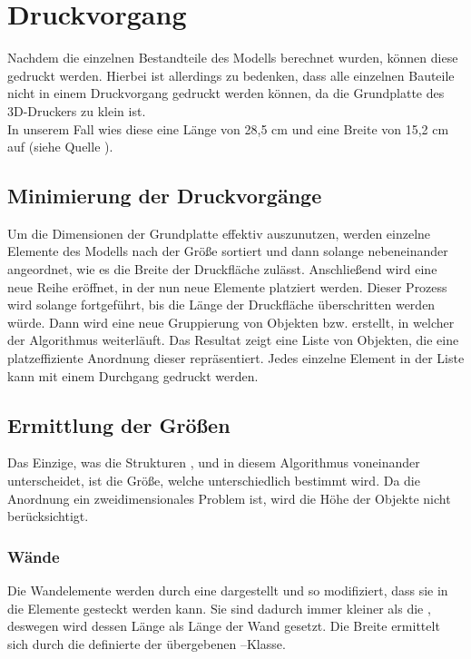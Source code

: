 \section{Druckvorgang}
Nachdem die einzelnen Bestandteile des Modells berechnet wurden, können diese gedruckt werden.
Hierbei ist allerdings zu bedenken, dass alle einzelnen Bauteile nicht in einem Druckvorgang gedruckt werden können, da die Grundplatte des 3D-Druckers zu klein ist. \\
In unserem Fall wies diese eine Länge von 28,5 cm und eine Breite von 15,2 cm auf (siehe Quelle \cite{makerbotspecs}).
\subsection{Minimierung der Druckvorgänge}
Um die Dimensionen der Grundplatte effektiv auszunutzen, werden einzelne Elemente des Modells nach der Größe sortiert und dann solange nebeneinander angeordnet, wie es die Breite der Druckfläche zulässt.
Anschließend wird eine neue Reihe eröffnet, in der nun neue Elemente platziert werden. 
Dieser Prozess wird solange fortgeführt, bis die Länge der Druckfläche überschritten werden würde.
Dann wird eine neue Gruppierung von Objekten bzw.  erstellt, in welcher der Algorithmus weiterläuft.
Das Resultat zeigt eine Liste von Objekten, die eine platzeffiziente Anordnung dieser repräsentiert.
Jedes einzelne Element in der Liste kann mit einem Durchgang gedruckt werden.
\subsection{Ermittlung der Größen}
Das Einzige, was die Strukturen ,  und  in diesem Algorithmus voneinander unterscheidet, ist die Größe, welche unterschiedlich bestimmt wird.
Da die Anordnung ein zweidimensionales Problem ist, wird die Höhe der Objekte nicht berücksichtigt.
\subsubsection{Wände}
Die Wandelemente werden durch eine  dargestellt und so modifiziert, dass sie in die  Elemente gesteckt werden kann.
Sie sind dadurch immer kleiner als die , deswegen wird dessen Länge als Länge der Wand gesetzt. 
Die Breite ermittelt sich durch die definierte  der übergebenen --Klasse.
